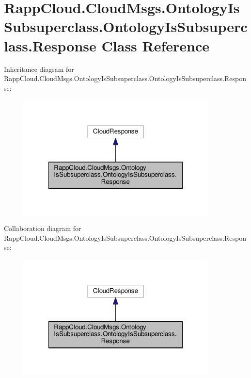 \hypertarget{classRappCloud_1_1CloudMsgs_1_1OntologyIsSubsuperclass_1_1OntologyIsSubsuperclass_1_1Response}{\section{Rapp\-Cloud.\-Cloud\-Msgs.\-Ontology\-Is\-Subsuperclass.\-Ontology\-Is\-Subsuperclass.\-Response Class Reference}
\label{classRappCloud_1_1CloudMsgs_1_1OntologyIsSubsuperclass_1_1OntologyIsSubsuperclass_1_1Response}
}


Inheritance diagram for Rapp\-Cloud.\-Cloud\-Msgs.\-Ontology\-Is\-Subsuperclass.\-Ontology\-Is\-Subsuperclass.\-Response\-:
\nopagebreak
\begin{figure}[H]
\begin{center}
\leavevmode
\includegraphics[width=286pt]{classRappCloud_1_1CloudMsgs_1_1OntologyIsSubsuperclass_1_1OntologyIsSubsuperclass_1_1Response__inherit__graph}
\end{center}
\end{figure}


Collaboration diagram for Rapp\-Cloud.\-Cloud\-Msgs.\-Ontology\-Is\-Subsuperclass.\-Ontology\-Is\-Subsuperclass.\-Response\-:
\nopagebreak
\begin{figure}[H]
\begin{center}
\leavevmode
\includegraphics[width=286pt]{classRappCloud_1_1CloudMsgs_1_1OntologyIsSubsuperclass_1_1OntologyIsSubsuperclass_1_1Response__coll__graph}
\end{center}
\end{figure}
